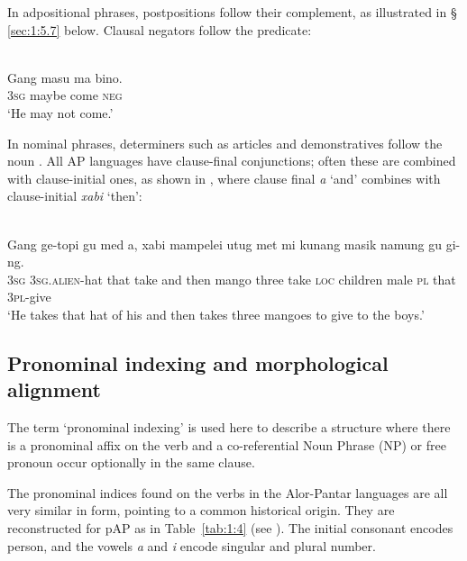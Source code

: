 


In adpositional phrases, postpositions follow their complement, as illustrated in {\S} \ref{sec:1:5.7} below. Clausal negators follow the predicate:  


\ea%
\label{ex:1:2}
\\
\gll Gang  masu  ma  bino. \\
\textsc{3sg} maybe  come  \textsc{neg} \\
\glt  `He may not come.' 
\z
 





In nominal phrases, determiners such as articles and demonstratives follow the noun \citep[see][]{KlamerSchapperCorbettTVnumeralwords}. All AP languages have clause-final conjunctions; often these are combined with clause-initial ones, as shown in , where clause final \textit{a} `and' combines with clause-initial \textit{xabi} `then': 



\ea%
\label{ex:1:3}
\\
\gll Gang  ge-topi  gu  med  a, xabi  mampelei  utug  met  mi  kunang  masik   namung  gu  gi-ng. \\
 \textsc{3sg}  \textsc{3sg.alien-}hat  that  take  and  then  mango  three  take  \textsc{loc} children  male  \textsc{pl} that  \textsc{3pl}{}-give     \\
\glt  `He takes that hat of his and  then takes three mangoes to give to the boys.'   
\z


\subsection{Pronominal indexing and morphological alignment}\label{sec:1:5.2}
The term `pronominal indexing' is used here \citep[and in][]{FeddenEtAlTV} to describe a structure where there is a pronominal affix on the verb and a co-referential Noun Phrase (NP) or free pronoun occur optionally in the same clause. 

The pronominal indices found on the verbs in the Alor-Pantar languages are all very similar in form, pointing to a common historical origin. They are reconstructed for pAP as in Table~\ref{tab:1:4} (see \citealt{HoltonRobinsonTVhistory,HoltonRobinsonTVposition,SchapperEtAlTVtimor}). The initial consonant encodes person, and the vowels \textit{a} and \textit{i} encode singular and plural number.  

